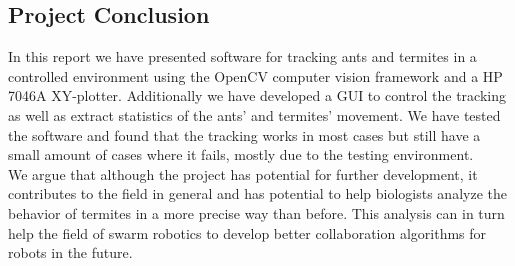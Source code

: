 
\subsection{Project Conclusion}

In this report we have presented software for tracking ants and termites in a controlled environment using the OpenCV computer vision framework and a HP 7046A XY-plotter. Additionally we have developed a GUI to control the tracking as well as extract statistics of the ants' and termites' movement. We have tested the software and found that the tracking works in most cases but still have a small amount of cases where it fails, mostly due to the testing environment. \\

We argue that although the project has potential for further development, it contributes to the field in general and has potential to help biologists analyze the behavior of termites in a more precise way than before. This analysis can in turn help the field of swarm robotics to develop better collaboration algorithms for robots in the future.

